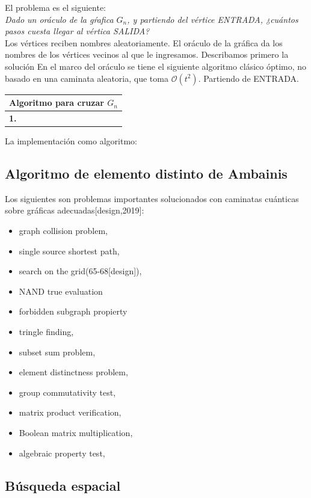 El problema es el siguiente:\\

\textit{Dado un oráculo de la gŕafica $G_n$, y partiendo del vértice ENTRADA, ¿cuántos pasos cuesta llegar al vértica SALIDA?}\\

Los vértices reciben nombres aleatoriamente. El oráculo de la gráfica da los nombres de los vértices vecinos al que le ingresamos. Describamos primero la solución En el marco del oráculo se tiene el siguiente algoritmo clásico óptimo, no basado en una caminata aleatoria, que toma $\mathcal{O}(t^2)$. Partiendo de ENTRADA.
\begin{center}
    \begin{tabular}{l}
    \hline \textbf{Algoritmo para cruzar $G_n$} \\\hline 
    \textbf{1.} 
    \\\hline
    \end{tabular}{}
\end{center}{}

La implementación como algoritmo:
\subsection{Algoritmo de elemento distinto de Ambainis}
Los siguientes son problemas importantes solucionados con caminatas cuánticas sobre gráficas adecuadas[design,2019]:
\begin{itemize}
\item graph collision problem,
\item single source shortest path,
\item search on the grid(65-68[design]),
\item NAND true evaluation
\item forbidden subgraph propierty
\item tringle finding,
\item subset sum problem,
\item element distinctness problem,
\item group commutativity test,
\item matrix product verification,
\item Boolean matrix multiplication,
\item algebraic property test,
\end{itemize}{}

\subsection{Búsqueda espacial}

